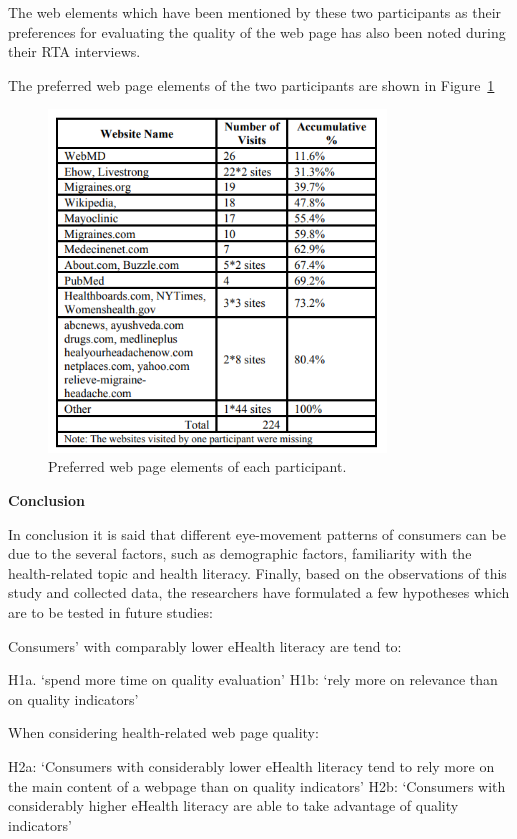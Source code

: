 \documentclass[]{article}
\begin{document}
The web elements which have been mentioned by these two participants as their preferences for evaluating the quality of the web page has also been noted during their RTA interviews.  

The preferred web page elements of the two participants are shown in Figure~\ref{fig3}

\begin{figure}[b!]
	\includegraphics[width=0.8\textwidth]{Capture3.png}
	\caption{Preferred web page elements of each participant. \label{fig3}}
\end{figure} 

\textbf{Conclusion}

In conclusion it is said that different eye-movement patterns of consumers can be due to the several factors, such as demographic factors, familiarity with the health-related topic and health literacy. Finally, based on the observations of this study and collected data, the researchers have formulated a few hypotheses which are to be tested in future studies:

Consumers’ with comparably lower eHealth literacy are tend to:  

H1a. ‘spend more time on quality evaluation’
H1b: ‘rely more on relevance than on quality indicators’  

When considering health-related web page quality:

H2a: ‘Consumers with considerably lower eHealth literacy tend to rely more on the main content of a webpage than on quality indicators’
H2b: ‘Consumers with considerably higher eHealth literacy are able to take advantage of quality indicators’
\end{document}
